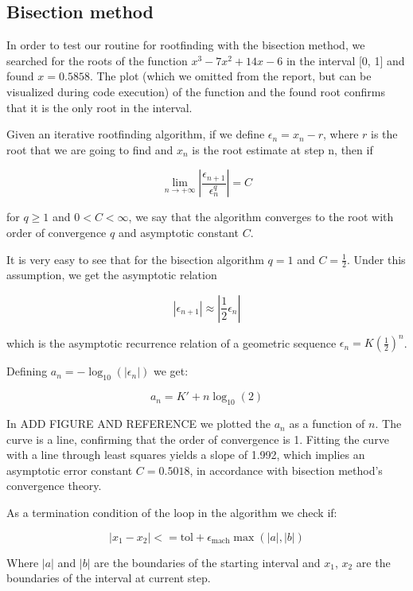 \documentclass[a4paper,11]{article}
\begin{document}
\subsection{Bisection method}\label{ssec:bis_method}

In order to test our routine for rootfinding with the bisection method,
we searched for the roots of the function $x^3-7x^2+14x-6$ in the interval 
[0, 1] and found $x = 0.5858$. The plot (which we omitted from the report, 
but can be visualized during code execution) of the function and the 
found root confirms that it is the only root in the interval.  

Given an iterative rootfinding algorithm, 
if we define $\epsilon_{n} = x_{n}-r$, where $r$
is the root that we are going to find and $x_{n}$ is the root estimate at step
n, then if 

\begin{equation}
	\lim_{n \to +\infty} \left| \frac{\epsilon_{n+1}}{\epsilon_{n}^{q}} \right |=C
\end{equation}

for $q \geq 1$ and $0<C<\infty$, we say that the algorithm converges to the root
with order of convergence $q$ and asymptotic constant $C$.

It is very easy to see that for the bisection algorithm $q=1$ and $C=\frac{1}{2}$.
Under this assumption, we get the asymptotic relation

\[
	|\epsilon_{n+1}| \approx |\frac{1}{2}\epsilon_{n}|
\]

which is the asymptotic recurrence relation of a geometric sequence 
$\epsilon_{n}=K(\frac{1}{2})^{n}$.

Defining $a_{n}=-\log_{10}(|\epsilon_{n}|)$ we get:

\[
	a_{n} = K' + n \log_{10}(2)
\]

In ADD FIGURE AND REFERENCE we plotted the $a_{n}$ as a function of $n$. 
The curve is a line, confirming that the order of convergence is 1. 
Fitting the curve with a line through least squares yields a slope of
1.992, which implies an asymptotic error constant $C = 0.5018$, 
in accordance with bisection method's convergence theory.

As a termination condition of the loop in the algorithm we check if:

\[
	|x_{1}-x_{2}| <= \text{tol} + \epsilon_{\text{mach}}\max(|a|,|b|)
\]

Where $|a|$ and $|b|$ are the boundaries of the starting interval and 
$x_{1}$, $x_{2}$ are the boundaries of the interval at current step.
\end{document}
